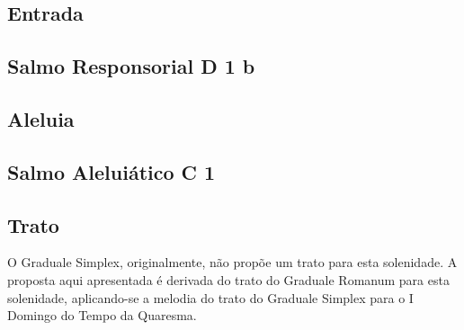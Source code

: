 \def\Prefix{proprium-sanctorum/sancti-ioseph-sponsi-bmv/}

\subsection{Entrada}\label{subsection:proprium-sanctorum/sancti-ioseph-sponsi-bmv/introitus}
\def\AntiphonAnnotation{\CantusID{003507}[Mt 1,20]}
\def\AntiphonScore{ioseph-fili-david.7a/}

\subsection{Salmo Responsorial \textmd{D 1 b}}\label{subsection:proprium-sanctorum/sancti-ioseph-sponsi-bmv/psalmus-responsorius}

\subsection{Aleluia}\label{subsection:proprium-sanctorum/sancti-ioseph-sponsi-bmv/alleluia}
\def\AntiphonScore{alleluia.4E.1/}

\AllowPageFlush

\subsection[Salmo Aleluiático]{Salmo Aleluiático \textmd{C 1}}\label{subsection:proprium-sanctorum/sancti-ioseph-sponsi-bmv/psalmus-alleluiaticus}

\AllowPageFlush

\subsection{Trato}\label{subsection:proprium-sanctorum/sancti-ioseph-sponsi-bmv/tractus}
\begin{rubrica}
  O Graduale Simplex, originalmente, não propõe um trato para esta solenidade. A proposta aqui apresentada é derivada do trato do Graduale Romanum para esta solenidade, aplicando-se a melodia do tra\-to do Graduale Simplex para o I Domingo do Tempo da Quaresma.
\end{rubrica}


